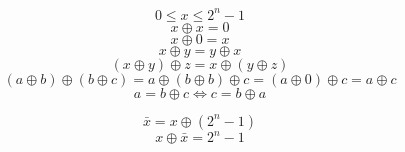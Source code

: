 \documentclass{basic}
\newcommand*\xor{\oplus}
\begin{document}
\[0 \leq x \leq 2^n-1\]
\[x \xor x = 0\]
\[x \xor 0 = x\]
\[x \xor y = y \xor x\]
\[(x \xor y) \xor z = x \xor (y \xor z)\]
\[(a \xor b) \xor (b \xor c) = a \xor (b \xor b) \xor c  = (a \xor 0) \xor c = a \xor c\]
\[a = b \xor c \Leftrightarrow c = b \xor a\]

\[\bar{x} = x \xor (2^n-1)\]
\[x \xor \bar{x} = 2^n-1\]
\end{document}

